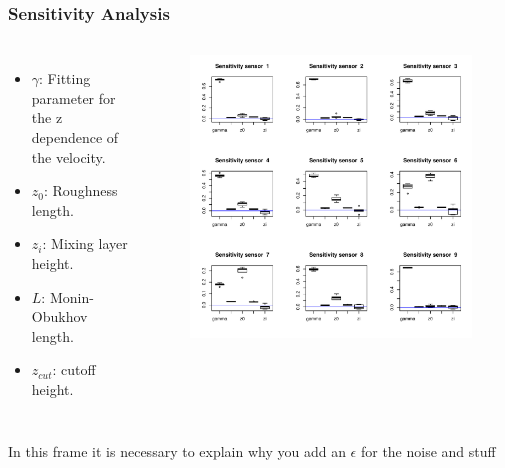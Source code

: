 \documentclass[11pt]{beamer}
\theoremstyle{plain}
\theoremstyle{definition}
\newcommand\ChangeFont{\fontsize{9}{7.2}\selectfont}
\begin{document}
\begin{frame}
\frametitle{Sensitivity Analysis}
\begin{columns}[c]
\column{1.5in}
\ChangeFont
\begin{itemize}
\item $\gamma$: Fitting parameter for the z dependence of the velocity.
\item $z_{0}$: Roughness length.
\item $z_{i}$: Mixing layer height.
\item $L$: Monin-Obukhov length.
\item $z_{cut}$: cutoff height.
\end{itemize}

\column{1.5in}
\begin{figure}
\includegraphics[scale=0.3]{../FigChap4/sensitivityPlot.pdf}
\end{figure}

\end{columns}
\end{frame}

\begin{frame}
In this frame it is necessary to explain why you add an $\epsilon$ for the noise and stuff

\end{frame}
\end{document}
